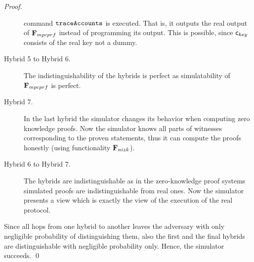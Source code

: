 \documentclass[runningheads,10pt]{llncs}
\numberwithin{equation}{section}
\begin{document}
\begin{proof}
\begin{description}
    command $\mathtt{traceAccounts}$ is executed. That is, it outputs the real output
    of $\mathbf{F}_{{mpcprf}}$ instead of programming its output. This is possible,
    since $\mathsf{c}_{key}$ consists of the real key not a dummy.
  \item[{Hybrid 5 to Hybrid 6.}] The indistinguishability of the hybrids is
    perfect as simulatability of $\mathbf{F}_{{mpcprf}}$ is perfect.
  \item[{Hybrid 7.}] In the last hybrid the simulator changes its behavior when
    computing zero knowledge proofs. Now the simulator knows all parts of
    witnesses corresponding to the proven statements, thus it can compute the
    proofs honestly (using functionality $\mathbf{F}_{{nizk}}$).
  \item[{Hybrid 6 to Hybrid 7.}] The hybrids are indistinguishable as in the
    zero-knowledge proof systems simulated proofs are indistinguishable from
    real ones. Now the simulator presents a view which is exactly the view of
    the execution of the real protocol.
  \end{description}
  Since all hops from one hybrid to another leaves the adversary with only
  negligible probability of distinguishing them, also the first and the final
  hybrids are distinguishable with negligible probability only. Hence, the
  simulator succeeds. \qed
\end{proof}
\end{document}
